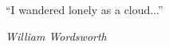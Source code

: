 
\clearpage

\null\vfill


\vspace*{4mm}


\enquote{I wandered lonely as a cloud...}
\begin{flushright} \emph{William Wordsworth} \end{flushright}


\vfill\vfill



